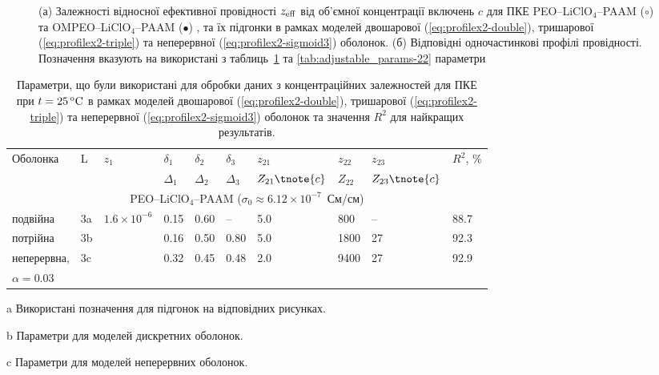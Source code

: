 \documentclass[14pt,twoside]{vakthesis}
\begin{document}
\begin{figure}[tb]
\begin{subfigure}[c]{0.45\textwidth}
		\caption{} \label{fig:OMPEO-LiClO4b}
	\end{subfigure}
	\caption{\label{fig:OMPEO-LiClO4} (а) Залежності відносної ефективної провідності ${z}_{\rm eff}$ від об'ємної концентрації включень $c$ для ПКЕ PEO--LiClO$_4$--PAAM ($\circ$)
		\cite{Przl1995, Wiec1994} та OMPEO--LiClO$_4$--PAAM ($\bullet$) \cite{Wiec1994}, та їх підгонки в рамках моделей двошарової (\ref{eq:profilex2-double}), тришарової (\ref{eq:profilex2-triple}) та неперервної (\ref{eq:profilex2-sigmoid3}) оболонок. (б) Відповідні одночастинкові профілі провідності. Позначення вказують на використані з таблиць~\ref{tab:adjustable_params-21} та \ref{tab:adjustable_params-22} параметри}
\end{figure}

\begin{table}[!htb]
	\centering \caption{\label{tab:adjustable_params-21} Параметри, що були
		використані для обробки даних \cite{Przl1995,Wiec1994} з 
		концентраційних залежностей для ПКЕ при $t= 25\,\rm{^oC}$ в 
		рамках моделей двошарової (\ref{eq:profilex2-double}), тришарової (\ref{eq:profilex2-triple}) 
		та неперервної 
		(\ref{eq:profilex2-sigmoid3}) оболонок та значення $R^2$
		для найкращих результатів.}
	\begin{threeparttable}
		\begin{tabularx}{\textwidth}{|X|l|X|l|l|l|l|l|l|l|}
			\hline
			\multirow{2}{*}{Оболонка} &\multirow{2}{*}{L\tnote{a}} &   \multirow{2}{*}{${z}_1$} & $\delta_1$\tnote{b} & $\delta_2$\tnote{b} & $\delta_3$\tnote{b} & ${z}_{21}$\tnote{b} & ${z}_{22}$\tnote{b} & ${z}_{23}$\tnote{b} & \multirow{2}{*}{$R^2$, \%} \\
			&  & & $\Delta_1$\tnote{c}& $\Delta_2$\tnote{c}&$\Delta_3$\tnote{c}&${Z}_{21}\tnote{c}$&${Z}_{22}$\tnote{c}&${Z}_{23} \tnote{c}$ & \\
			\hline
			\multicolumn{10}{c}{PEO--LiClO$_4$--PAAM ($\sigma_0 \approx 6.12\times 10^{-7}$~См/см)}\\
			\hline
			подвійна &3a & \multirow{4}{*}{$1.6\times 10^{-6}$} &0.15&0.60& -- & 5.0           &800 &--& 88.7 \\
			потрійна  &3b                                     &                  &0.16&0.50&0.80 & 5.0 &1800 &27 &  92.3 \\
			неперервна,  &3c                      &                   &0.32&0.45&0.48 & 2.0     &9400&27 & 92.9 \\
			$\alpha =0.03$ &   & & & & & &  & & \\
			\hline
		\end{tabularx}
		\begin{tablenotes}
			\item[a] Використані позначення для підгонок на відповідних
			рисунках.
			\item[b] Параметри для моделей дискретних оболонок.
			\item[c] Параметри для моделей неперервних оболонок.
		\end{tablenotes}
	\end{threeparttable}
\end{table}
\end{document}

